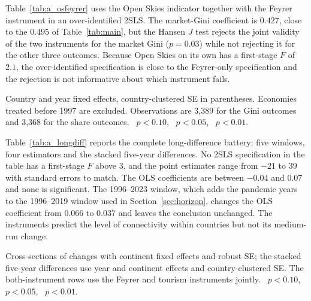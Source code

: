 Table~\ref{tab:a_osfeyrer} uses the Open Skies indicator together with the Feyrer instrument in an over-identified 2SLS. The market-Gini coefficient is $0.427$, close to the $0.495$ of Table~\ref{tab:main}, but the Hansen $J$ test rejects the joint validity of the two instruments for the market Gini ($p=0.03$) while not rejecting it for the other three outcomes. Because Open Skies on its own has a first-stage $F$ of $2.1$, the over-identified specification is close to the Feyrer-only specification and the rejection is not informative about which instrument fails.

\begin{table}[H]\centering\caption{Over-identified 2SLS with the Open Skies indicator and the Feyrer instrument.}\label{tab:a_osfeyrer}
\begin{threeparttable}\small
\begin{tablenotes}\footnotesize\item Country and year fixed effects, country-clustered SE in parentheses. Economies treated before 1997 are excluded. Observations are 3,389 for the Gini outcomes and 3,368 for the share outcomes. \sym{*}~$p<0.10$, \sym{**}~$p<0.05$, \sym{***}~$p<0.01$.\end{tablenotes}\end{threeparttable}\end{table}


Table~\ref{tab:a_longdiff} reports the complete long-difference battery: five windows, four estimators and the stacked five-year differences. No 2SLS specification in the table has a first-stage $F$ above $3$, and the point estimates range from $-21$ to $39$ with standard errors to match. The OLS coefficients are between $-0.04$ and $0.07$ and none is significant. The 1996--2023 window, which adds the pandemic years to the 1996--2019 window used in Section~\ref{sec:horizon}, changes the OLS coefficient from $0.066$ to $0.037$ and leaves the conclusion unchanged. The instruments predict the level of connectivity within countries but not its medium-run change.

\begin{table}[H]\centering\caption{Long differences and stacked differences, complete battery.}\label{tab:a_longdiff}
\begin{threeparttable}\small
\begin{tablenotes}\footnotesize\item Cross-sections of changes with continent fixed effects and robust SE; the stacked five-year differences use year and continent effects and country-clustered SE. The both-instrument rows use the Feyrer and tourism instruments jointly. \sym{*}~$p<0.10$, \sym{**}~$p<0.05$, \sym{***}~$p<0.01$.\end{tablenotes}\end{threeparttable}\end{table}

